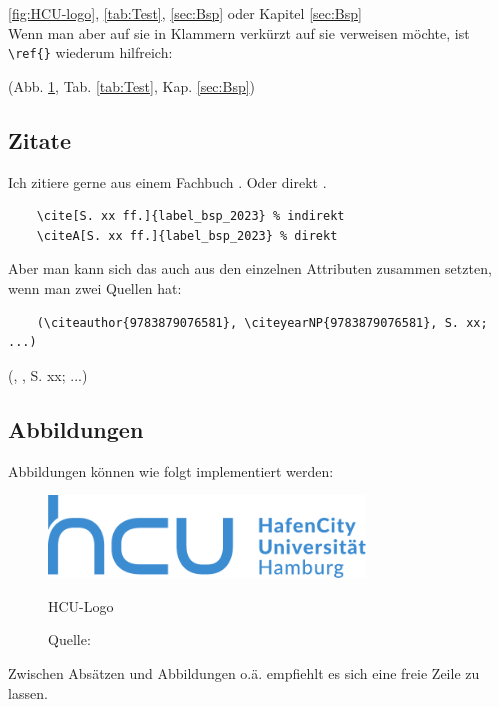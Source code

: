 \autoref{fig:HCU-logo}, \autoref{tab:Test}, \autoref{sec:Bsp} oder Kapitel \ref{sec:Bsp}\\

Wenn man aber auf sie in Klammern verkürzt auf sie verweisen möchte, ist \verb|\ref{}| wiederum hilfreich:

(Abb. \ref{fig:HCU-logo}, Tab. \ref{tab:Test}, Kap. \ref{sec:Bsp})


\subsection{Zitate} \label{sec:Zitate}

Ich zitiere gerne aus einem Fachbuch \cite[S. xx ff.]{9783879076581}. Oder direkt .

\begin{verbatim}
    \cite[S. xx ff.]{label_bsp_2023} % indirekt
    \citeA[S. xx ff.]{label_bsp_2023} % direkt
\end{verbatim}

Aber man kann sich das auch aus den einzelnen Attributen zusammen setzten, wenn man zwei Quellen hat:

\begin{verbatim}
    (\citeauthor{9783879076581}, \citeyearNP{9783879076581}, S. xx; ...)
\end{verbatim}

(\citeauthor{9783879076581}, , S. xx; ...)


\subsection{Abbildungen}

Abbildungen können wie folgt implementiert werden:

\begin{figure}[H]
	\centering
	\includegraphics[width=0.75\textwidth]{Daten/hcu_logo.pdf}
	\caption{HCU-Logo}
	\caption*{Quelle: } %
	\label{fig:HCU-logo}
\end{figure}

Zwischen Absätzen und Abbildungen o.ä. empfiehlt es sich eine freie Zeile zu lassen.

